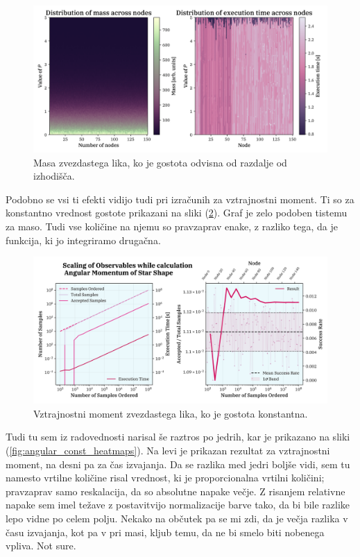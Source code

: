 \documentclass[a4paper]{article}
\begin{document}
\begin{figure}[H]
    \centering
    \includegraphics[width=\textwidth]{../StarShapes/Images/mass_radial_heatmaps.png}
    \caption{Masa zvezdastega lika, ko je gostota odvisna od razdalje od izhodišča.}
    \label{fig:mass_radial_heatmaps}
\end{figure}

Podobno se vsi ti efekti vidijo tudi pri izračunih za vztrajnostni moment. Ti so za konstantno vrednost gostote
prikazani na sliki (\ref{fig:angular_const}). Graf je zelo podoben tistemu za maso. Tudi vse količine na njemu so 
pravzaprav enake, z razliko tega, da je funkcija, ki jo integriramo drugačna.

\begin{figure}[H]
    \centering
    \includegraphics[width=\textwidth]{../StarShapes/Images/angular_const.png}
    \caption{Vztrajnostni moment zvezdastega lika, ko je gostota konstantna.}
    \label{fig:angular_const}
\end{figure}

Tudi tu sem iz radovednosti narisal še raztros po jedrih, kar je prikazano na sliki (\ref{fig:angular_const_heatmaps}).
Na levi je prikazan rezultat za vztrajnostni moment, na desni pa za čas izvajanja. Da se razlika med jedri boljše vidi, 
sem tu namesto vrtilne količine risal vrednost, ki je proporcionalna vrtilni količini; pravzaprav samo reskalacija, da 
so absolutne napake večje. Z risanjem relativne napake sem imel težave z postavitvijo normalizacije barve tako, da bi bile 
razlike lepo vidne po celem polju. Nekako na občutek pa se mi zdi, da je večja razlika v času izvajanja, kot pa v
pri masi, kljub temu, da ne bi smelo biti nobenega vpliva. Not sure. \\
\end{document}
